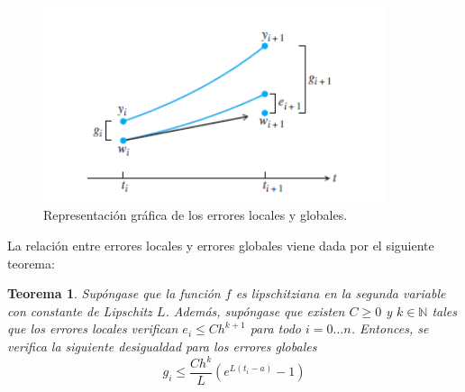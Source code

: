 \documentclass{article}
\theoremstyle{theorem-style}  %
\newtheorem{theorem}{Teorema}[section]  %
\theoremstyle{definition-style}
\theoremstyle{example-style}
\begin{document}
	\begin{figure}[h]
		\centering
		\includegraphics[width=10cm]{./Images/error-euler.png}
		\caption{Representación gráfica de los errores locales y globales.}
		\label{fig:error}
	\end{figure}

	La relación entre errores locales y errores globales viene dada por el siguiente teorema: 

	\begin{theorem} \label{theorem:local-global-error}
		Supóngase que la función $f$ es lipschitziana en la segunda variable con constante de Lipschitz $L$. Además, supóngase que existen $C \ge 0$ y $k \in \mathbb{N}$ tales que los errores locales verifican $e_i \le C h^{k+1}$ para todo $i = 0 \ldots n$. Entonces, se verifica la siguiente desigualdad para los errores globales
		\begin{equation}
			g_i \le \frac{C h^k}{L} (e^{L(t_i-a)}-1)
		\end{equation}
	\end{theorem}
\end{document}
